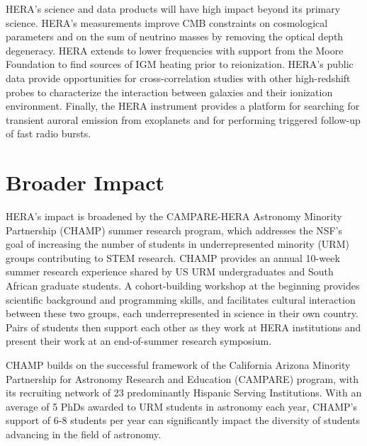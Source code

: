 \documentclass[preprint]{aastex}
\begin{document}
HERA's science and data products will have high impact beyond its primary science.  HERA's measurements improve CMB constraints on cosmological parameters and on the sum of neutrino masses by removing the optical depth degeneracy.  HERA extends to lower frequencies with support from the Moore Foundation to find sources of IGM heating prior to reionization.  HERA's public data provide opportunities for cross-correlation studies with other high-redshift probes to characterize the interaction between galaxies and their ionization environment.  Finally, the HERA instrument provides a platform for searching for transient auroral emission from exoplanets and for performing triggered follow-up of fast radio bursts.

\section*{Broader Impact}

HERA's impact is broadened by the CAMPARE-HERA Astronomy Minority Partnership (CHAMP) summer research program, which addresses the NSF's goal of increasing the number of students in underrepresented minority (URM) groups contributing to STEM research.  CHAMP provides an annual 10-week summer research experience shared by US URM undergraduates and South African graduate students. A cohort-building workshop at the beginning provides scientific background and programming skills, and facilitates cultural interaction between these two groups, each underrepresented in science in their own country. Pairs of students then support each other as they work at HERA institutions and present their work at an end-of-summer research symposium.

CHAMP builds on the successful framework of the California Arizona Minority Partnership for Astronomy Research and Education (CAMPARE) program, with its recruiting network of 23 predominantly Hispanic Serving Institutions. With an average of 5 PhDs awarded to URM students in astronomy each year, CHAMP's support of 6-8 students per year can significantly impact the diversity of students advancing in the field of astronomy.
\end{document}
